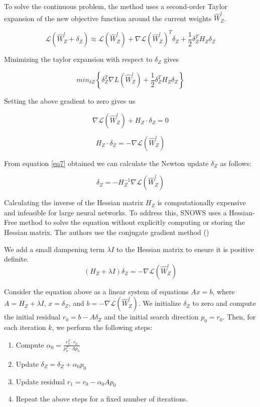 \documentclass[11pt]{extreport}
\begin{document}
		To solve the continuous problem, the method uses a second-order Taylor expansion of the new objective function around the current weights $\widehat{W}_Z^l$.
		
		\begin{equation} \label{eq4}
			\mathcal{L}(\widehat{W}_Z^l + \delta_Z) \approx \mathcal{L}(\widehat{W}_Z^l) + \nabla\mathcal{L}(\widehat{W}_Z^l)^T \delta_Z + \frac{1}{2}\delta_Z^T H_Z \delta_Z
		\end{equation}

		Minimizing the taylor expansion with respect to $\delta_Z$ gives

		\begin{equation} \label{eq5}
			min_{\delta Z} \left\{{\delta^{T}_Z} \nabla L(\widehat{W}^{l}_Z) + \frac{1}{2} \delta^{T}_Z H_Z \delta_Z \right\}
		\end{equation}

		Setting the above gradient to zero gives us

		\begin{equation} \label{eq6}
			\nabla \mathcal{L}(\widehat{W}^{l}_Z) + H_Z \cdot \delta_Z = 0
		\end{equation}

		\begin{equation}\label{eq7}
			H_Z \cdot \delta_Z = -\nabla\mathcal{L}(\widehat{W}_Z^l)
		\end{equation}

		From equation \ref{eq7} obtained we can calculate the Newton update $\delta_Z$ as follows:

		$$\delta_Z = -H_Z^{-1} \nabla\mathcal{L}(\widehat{W}_Z^l)$$

		Calculating the inverse of the Hessian matrix $H_Z$ is computationally expensive and infeasible for large neural networks. To address this, SNOWS uses a Hessian-Free method to solve the equation without explicitly computing or storing the Hessian matrix. The authors use the conjugate gradient method (\cite{ref1})

		We add a small dampening term $\lambda I$ to the Hessian matrix to ensure it is positive definite.
		$$(H_Z + \lambda I) \delta_Z = -\nabla\mathcal{L}(\widehat{W}_Z^l)$$

		Consider the equation above as a linear system of equations $A x = b$, where $A = H_Z + \lambda I$, $x = \delta_Z$, and $b = -\nabla\mathcal{L}(\widehat{W}_Z^l)$. We initialize $\delta_Z$ to zero and compute the initial residual $r_0 = b - A \delta_Z$ and the initial search direction $p_0 = r_0$. Then, for each iteration $k$, we perform the following steps:
		\begin{enumerate}
			\item Compute \(\alpha_0 = \frac{r^{T}_0 \cdot r_0}{p^{T}_0 \cdot Ap_0}\)
			\item Update \(\delta_Z = \delta_Z + \alpha_0 p_0\)
			\item Update residual \(r_1 = r_0 - \alpha_0 Ap_0\)
			\item Repeat the above steps for a fixed number of iterations.
		\end{enumerate}
\end{document}
